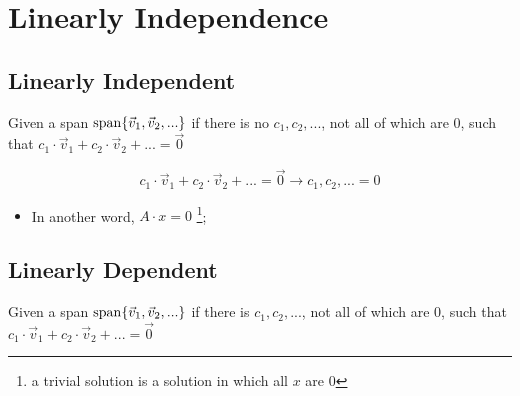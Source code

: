 \section{Linearly Independence}

\subsection{Linearly Independent}

  \begin{definition}
    Given a span $ \operatorname{span} \{ \vec{v}_{1}, \vec{v}_{2}, ... \} $
    if there is no $ c_{1}, c_{2}, ... $, not all of which are $ 0 $,
    such that $ c_{1} \cdot \vec{v}_{1} + c_{2} \cdot \vec{v}_{2} + ... = \vec{0} $
  \end{definition}
  \begin{equation}
    c_{1} \cdot \vec{v}_{1} + c_{2} \cdot \vec{v}_{2} + ... = \vec{0} 
    \rightarrow
    c_{1}, c_{2}, ... = 0
  \end{equation}
  
  \begin{itemize}
    \item In another word, $ A \cdot x = 0 $ 
    \footnote{a trivial solution 
    is a solution in which all $ x $ are $ 0 $};
  \end{itemize}

\subsection{Linearly Dependent}

  \begin{definition}
    Given a span $ \operatorname{span} \{ \vec{v}_{1}, \vec{v}_{2}, ... \} $
    if there is $ c_{1}, c_{2}, ... $, not all of which are $ 0 $,
    such that $ c_{1} \cdot \vec{v}_{1} + c_{2} \cdot \vec{v}_{2} + ... = \vec{0} $
  \end{definition}
